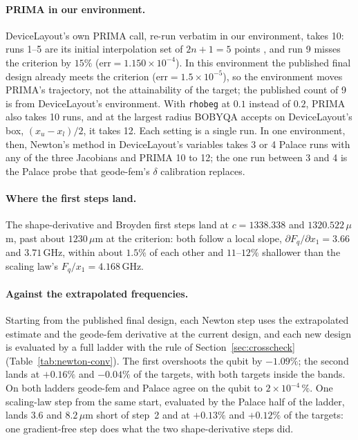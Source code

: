 \documentclass{anvil-paper}
\begin{document}
\paragraph{PRIMA in our environment.}
DeviceLayout's own PRIMA call,
re-run verbatim in our environment, takes 10: runs 1--5 are its initial
interpolation set of $2n+1 = 5$ points \citep{powell2009bobyqa}, and run 9
misses the criterion by $15\%$ ($\mathrm{err} = 1.150\times10^{-4}$). In
this environment the published final design already meets the criterion
($\mathrm{err} = 1.5\times10^{-5}$), so the environment moves PRIMA's
trajectory, not the attainability of the target; the published count of 9
is from DeviceLayout's environment. With \texttt{rhobeg}
at $0.1$ instead of $0.2$, PRIMA also takes 10 runs, and
at the largest radius BOBYQA accepts on DeviceLayout's box, $(x_u -
x_l)/2$, it takes 12. Each setting is a single run. In one environment, then,
Newton's method in DeviceLayout's variables takes 3 or 4 Palace runs with
any of the three Jacobians and PRIMA 10 to 12; the one run between 3 and
4 is the Palace probe that geode-fem's $\delta$ calibration replaces.

\paragraph{Where the first steps land.}
The shape-derivative and Broyden first steps land at $c = 1338.338$ and
$1320.522\,\mu$m, past about $1230\,\mu$m at the criterion: both follow
a local slope, $\partial F_q/\partial x_1 = 3.66$ and $3.71$\,GHz, within about $1.5\%$ of each other and $11$--$12\%$ shallower than the scaling law's $F_q/x_1 = 4.168$\,GHz.

\paragraph{Against the extrapolated frequencies.}
Starting from the published final design, each Newton step uses the
extrapolated estimate and the geode-fem derivative at the current design,
and each new design is evaluated by a full ladder with the rule of
Section~\ref{sec:crosscheck} (Table~\ref{tab:newton-conv}).
The first overshoots the qubit by $-1.09\%$; the second lands at $+0.16\%$
and $-0.04\%$ of the targets, with both targets inside the bands. On both
ladders geode-fem and Palace agree on the qubit to $2\times10^{-4}\,\%$.
One scaling-law step from the same start, evaluated by the Palace half of
the ladder, lands $3.6$ and $8.2\,\mu$m short of step~2 and at $+0.13\%$
and $+0.12\%$ of the targets: one gradient-free step does what the two
shape-derivative steps did.
\end{document}
